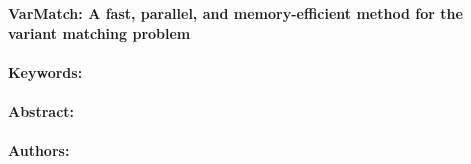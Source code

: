 \noindent
\large {\bf VarMatch: A fast, parallel, and memory-efficient method for the variant matching problem} 


\normalsize 


\noindent \paragraph{Keywords:} 

\noindent \paragraph{Abstract:} 



\noindent \paragraph{Authors:} 

